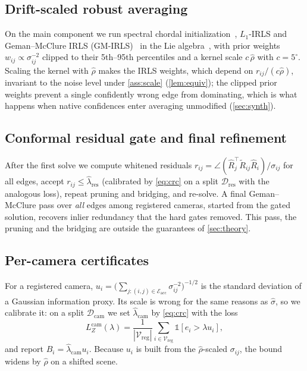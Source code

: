 \subsection{Drift-scaled robust averaging}
On the main component we run spectral chordal initialization~\cite{martinec2007robust}, $L_1$-IRLS and Geman--McClure IRLS (GM-IRLS)~\cite{chatterjee2018robust} in the Lie algebra~\cite{govindu2004lie}, with prior weights $w_{ij}\propto\sigma_{ij}^{-2}$ clipped to their 5th--95th percentiles and a kernel scale $c\,\hat\rho$ with $c=5^\circ$. Scaling the kernel with $\hat\rho$ makes the IRLS weights, which depend on $r_{ij}/(c\hat\rho)$, invariant to the noise level under \cref{ass:scale} (\cref{lem:equiv}); the clipped prior weights prevent a single confidently wrong edge from dominating, which is what happens when native confidences enter averaging unmodified (\cref{sec:synth}).

\subsection{Conformal residual gate and final refinement}
After the first solve we compute whitened residuals $r_{ij}=\angle(\hat R_j^{\top}\tilde R_{ij}\hat R_i)/\sigma_{ij}$ for all edges, accept $r_{ij}\le\hat\lambda_{\mathrm{res}}$ (calibrated by \eqref{eq:crc} on a split $\mathcal{D}_{\mathrm{res}}$ with the analogous loss), repeat pruning and bridging, and re-solve. A final Geman--McClure pass over \emph{all} edges among registered cameras, started from the gated solution, recovers inlier redundancy that the hard gates removed. This pass, the pruning and the bridging are outside the guarantees of \cref{sec:theory}.

\subsection{Per-camera certificates}
For a registered camera, $u_i=\big(\sum_{j:(i,j)\in\mathcal{E}_{\mathrm{acc}}}\sigma_{ij}^{-2}\big)^{-1/2}$ is the standard deviation of a Gaussian information proxy. Its scale is wrong for the same reasons as $\hat\sigma$, so we calibrate it: on a split $\mathcal{D}_{\mathrm{cam}}$ we set $\hat\lambda_{\mathrm{cam}}$ by \eqref{eq:crc} with the loss
\begin{equation}\label{eq:camloss}
L^{\mathrm{cam}}_Z(\lambda)=\frac{1}{|\mathcal{V}_{\mathrm{reg}}|}\sum_{i\in\mathcal{V}_{\mathrm{reg}}}\mathbb{1}[e_i>\lambda u_i],
\end{equation}
and report $B_i=\hat\lambda_{\mathrm{cam}}u_i$. Because $u_i$ is built from the $\hat\rho$-scaled $\sigma_{ij}$, the bound widens by $\hat\rho$ on a shifted scene.

